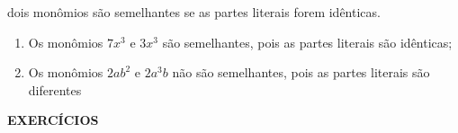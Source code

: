 \begin{tdefinicao}
    dois monômios são semelhantes se as partes literais forem idênticas.
\end{tdefinicao}


\begin{texemplo}\hfill
    \begin{enumerate}[label=(\textbf{\alph*)}]
        \item Os monômios $7x^3$ e $3x^3$ são semelhantes, pois as partes literais são idênticas;
        
        \item Os monômios  $2ab^2$ e $2a^3b$ não são semelhantes, pois as partes literais são diferentes \qedsymbol
    \end{enumerate}
\end{texemplo}


\noindent\textbf{EXERCÍCIOS \thesubsection}

\settowidth{}

